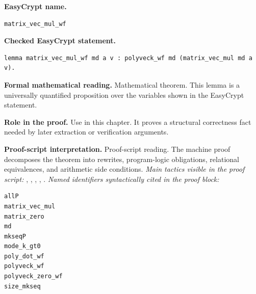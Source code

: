 \begin{formaltheorem}
\noindent\textbf{EasyCrypt name.}
\begin{lstlisting}[language=EasyCrypt,basicstyle=\ttfamily\scriptsize]
matrix_vec_mul_wf
\end{lstlisting}
\noindent\textbf{Checked EasyCrypt statement.}
\begin{lstlisting}[language=EasyCrypt,basicstyle=\ttfamily\scriptsize]
lemma matrix_vec_mul_wf md a v : polyveck_wf md (matrix_vec_mul md a v).
\end{lstlisting}
\noindent\textbf{Formal mathematical reading.}
Mathematical theorem. This lemma is a universally quantified proposition over the variables shown in the EasyCrypt statement.

\noindent\textbf{Role in the proof.}
Use in this chapter. It proves a structural correctness fact needed by later extraction or verification arguments.

\noindent\textbf{Proof-script interpretation.}
Proof-script reading. The machine proof decomposes the theorem into rewrites, program-logic obligations, relational equivalences, and arithmetic side conditions.
\emph{Main tactics visible in the proof script:} , , , , .
\emph{Named identifiers syntactically cited in the proof block:}
\begin{lstlisting}[language=EasyCrypt,basicstyle=\ttfamily\scriptsize]
allP
matrix_vec_mul
matrix_zero
md
mkseqP
mode_k_gt0
poly_dot_wf
polyveck_wf
polyveck_zero_wf
size_mkseq
\end{lstlisting}

\end{formaltheorem}

